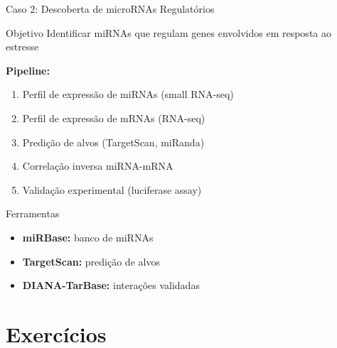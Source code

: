 \begin{frame}[shrink=10]{Caso 2: Descoberta de microRNAs Regulatórios}
\begin{block}{Objetivo}
Identificar miRNAs que regulam genes envolvidos em resposta ao estresse
\end{block}

\textbf{Pipeline:}
\begin{enumerate}
    \item Perfil de expressão de miRNAs (small RNA-seq)
    \item Perfil de expressão de mRNAs (RNA-seq)
    \item Predição de alvos (TargetScan, miRanda)
    \item Correlação inversa miRNA-mRNA
    \item Validação experimental (luciferase assay)
\end{enumerate}

\vspace{0.3cm}

\begin{alertblock}{Ferramentas}
\begin{itemize}
    \item \textbf{miRBase:} banco de miRNAs
    \item \textbf{TargetScan:} predição de alvos
    \item \textbf{DIANA-TarBase:} interações validadas
\end{itemize}
\end{alertblock}
\end{frame}

\section{Exercícios}


